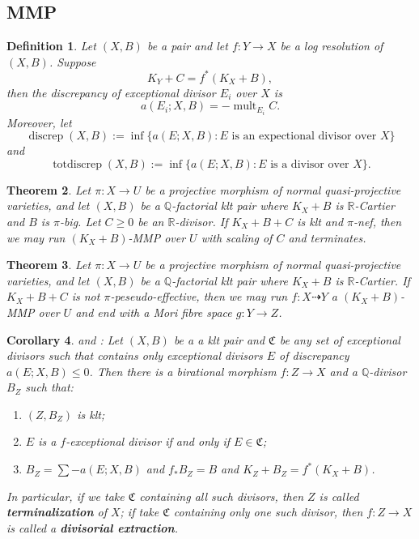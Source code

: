 \documentclass{article}
\newtheorem{defn}{Definition}[subsection]
\newtheorem{thm}[defn]{Theorem}
\newtheorem{cor}[defn]{Corollary}
\begin{document}
\subsection{MMP}
\begin{defn}
  Let $(X,B)$ be a pair  and let  $f:Y\to X$ be a log resolution of $(X,B)$. Suppose
  \[
  K_{Y}+C=f^*(K_{X}+B)
  ,\]
then the discrepancy  of exceptional divisor $E_{i}$ over $X$ is
\[
  a(E_{i};X,B)=-\operatorname{mult}_{E_{i}}C
.\]
 Moreover, let
\[
  \operatorname{discrep}(X, B) := \operatorname{inf}\{a(E; X, B) : E \text{ is an expectional divisor over } X \}
\]
and
\[
  \operatorname{totdiscrep}(X, B) :=\operatorname{inf}\{a(E; X, B) : E \text{ is a divisor over } X\}.
\]
\end{defn}
\begin{thm}
\cite[Corollary 1.4.2]{birkarExistenceMinimalModels2009}Let $ \pi:X\to U $ be a projective morphism of normal quasi-projective varieties, and let $(X,B)$ be a $\mathbb{Q}$-factorial klt pair where $K_{X}+B$ is $\mathbb{R}$-Cartier and $B$ is $\pi$-big. Let $C\geqslant0$ be an $\mathbb{R}$-divisor. If $K_{X}+B+C$ is klt and  $\pi$-nef, then we may run $(K_{X}+B)$-MMP over $U$  with scaling of $C$ and  terminates.
\end{thm}
\begin{thm}\label{notpseudoeffmfs}
  \cite[Corollary 1.3.3]{birkarExistenceMinimalModels2009}Let $ \pi:X\to U $ be a projective morphism of normal quasi-projective varieties, and let $(X,B)$ be a $\mathbb{Q}$-factorial klt pair where $K_{X}+B$ is $\mathbb{R}$-Cartier.  If $K_{X}+B+C$ is  not $\pi$-peseudo-effective, then we may run $f:X\dashrightarrow Y$ a $(K_{X}+B)$-MMP over   $U$ and end with a Mori fibre space $g:Y\to Z$.
\end{thm}

\begin{cor}\label{extraction}
  \cite[Corollary 13.7]{haconMinimalModelProgram2012} and \cite[Corollary 1.4.3]{birkarExistenceMinimalModels2009}: Let $ (X,B) $ be a a klt pair and $\mathfrak{C}$ be any set of exceptional divisors such that  contains only exceptional divisors $ E $ of discrepancy $ a(E;X,B)\leqslant 0 $. Then there is a birational morphism $ f:Z\to X $ and a $ \mathbb{Q} $-divisor $ B_Z $ such that:
  \begin{enumerate}
    \item $ (Z,B_Z) $ is klt;
    \item $ E $ is a $f$-exceptional divisor if and only if $ E\in \mathfrak{C} $;
    \item $ B_Z=\sum-a(E;X,B) $ and $ f_*B_Z=B $ and $ K_Z+B_Z=f^*(K_X+B) $.
  \end{enumerate} 
  In particular, if we take $\mathfrak{C}$ containing all such divisors, then $ Z $ is called \textbf{terminalization} of $ X $; if take $\mathfrak{C}$ containing only one such divisor, then $ f:Z\to X $ is called a \textbf{divisorial extraction}.    
\end{cor}
\end{document}
